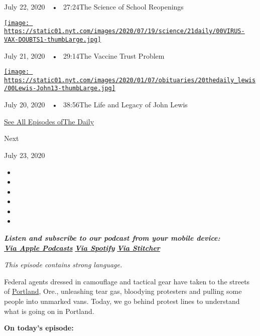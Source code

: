 July 22, 2020~~•~ 27:24The Science of School Reopenings

\href{https://www.nytimes.com/2020/07/21/podcasts/the-daily/coronavirus-vaccine.html?action=click\&module=audio-series-bar\&region=header\&pgtype=Article}{\texttt{[image: https://static01.nyt.com/images/2020/07/19/science/21daily/00VIRUS-VAX-DOUBTS1-thumbLarge.jpg]}}

July 21, 2020~~•~ 29:14The Vaccine Trust Problem

\href{https://www.nytimes.com/2020/07/20/podcasts/the-daily/john-lewis.html?action=click\&module=audio-series-bar\&region=header\&pgtype=Article}{\texttt{[image: https://static01.nyt.com/images/2020/01/07/obituaries/20thedaily\_lewis/00Lewis-John13-thumbLarge.jpg]}}

July 20, 2020~~•~ 38:56The Life and Legacy of John Lewis

\href{https://www.nytimes.com/column/the-daily}{See All Episodes ofThe
Daily}

Next

July 23, 2020

\begin{itemize}
\item
\item
\item
\item
\item
\item
\end{itemize}

\emph{\textbf{Listen and subscribe to our podcast from your mobile
device:}}\\
\textbf{\href{https://itunes.apple.com/us/podcast/the-daily/id1200361736?mt=2}{\emph{Via
Apple Podcasts}}} \emph{\textbf{\textbar{}}}
\textbf{\href{https://open.spotify.com/show/3IM0lmZxpFAY7CwMuv9H4g?si=SfuMSC55R1qprFsRZU3_zw}{\emph{Via
Spotify}}} \emph{\textbf{\textbar{}}}
\textbf{\href{http://www.stitcher.com/podcast/the-new-york-times/the-daily-10}{\emph{Via
Stitcher}}}

\emph{This episode contains strong language.}

Federal agents dressed in camouflage and tactical gear have taken to the
streets of
\href{https://www.nytimes.com/2020/07/23/upshot/trump-portland.html}{Portland},
Ore., unleashing tear gas, bloodying protesters and pulling some people
into unmarked vans. Today, we go behind protest lines to understand what
is going on in Portland.

\textbf{On today's episode:}

